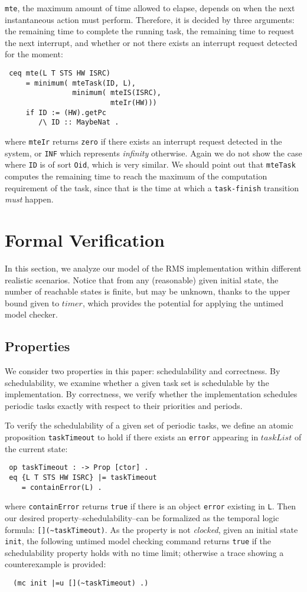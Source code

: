 \documentclass[10pt,journal]{IEEEtran}
\begin{document}
\verb|mte|, the maximum amount of time allowed to elapse, depends on
when the next instantaneous action must perform. Therefore, it is
decided by three arguments: the remaining time to complete the running
task, the remaining time to request the next interrupt, and whether or
not there exists an interrupt request detected for the moment:
\begin{verbatim}
 ceq mte(L T STS HW ISRC)
     = minimum( mteTask(ID, L),
                minimum( mteIS(ISRC), 
                         mteIr(HW)))
     if ID := (HW).getPc 
        /\ ID :: MaybeNat .
\end{verbatim}
where \verb|mteIr| returns \verb|zero| if there exists an interrupt
request detected in the system, or \verb|INF| which represents
\emph{infinity} otherwise. Again we do not show the case where
\verb|ID| is of sort \verb|Oid|, which is very similar. We should
point out that \verb|mteTask| computes the remaining time to reach the
maximum of the computation requirement of the task, since that is the
time at which a \verb|task-finish| transition \emph{must} happen.


\section{Formal Verification}
\label{s:verification}
In this section, we analyze our model of the RMS implementation within
different realistic scenarios.  Notice that from any (reasonable)
given initial state, the number of reachable states is finite, but may
be unknown, thanks to the upper bound given to $timer$, which provides
the potential for applying the untimed model checker.

\subsection{Properties}
We consider two properties in this paper: schedulability and
correctness. By schedulability, we examine whether a given task set is
schedulable by the implementation. By correctness, we verify whether
the implementation schedules periodic tasks exactly with respect to
their priorities and periods.

To verify the schedulability of a given set of periodic tasks, we
define an atomic proposition \verb|taskTimeout| to hold if there
exists an \verb|error| appearing in $taskList$ of the current state:
\begin{verbatim}
 op taskTimeout : -> Prop [ctor] .
 eq {L T STS HW ISRC} |= taskTimeout 
    = containError(L) .
\end{verbatim}
where \verb|containError| returns \verb|true| if there is an object
\verb|error| existing in \verb|L|. Then our desired
property--schedulability--can be formalized as the temporal logic
formula: \verb|[](~taskTimeout)|. As the property is not
\emph{clocked}, given an initial state \verb|init|, the following
untimed model checking command returns \verb|true| if the
schedulability property holds with no time limit; otherwise a trace
showing a counterexample is provided:
\begin{verbatim}
  (mc init |=u [](~taskTimeout) .)
\end{verbatim}
\end{document}
